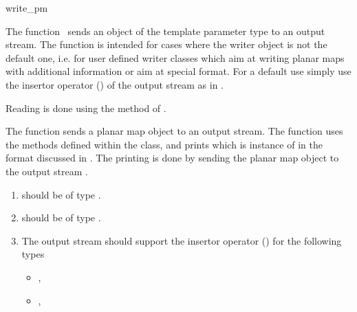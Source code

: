 
\ccRefPageBegin


\begin{ccRefFunction}{write_pm}


\ccDefinition

The function \ccRefName\ sends an object of the template parameter
type  to an output stream. The function is intended
for cases where the writer object is not the default one, i.e. for
user defined writer classes which aim at writing planar maps with
additional information or aim at special format. For a default use
simply use the insertor operator (\ccc{<<}) of the output stream as in
.

Reading is done using the  method of
.


           {The function sends a planar map object to an output
           stream. The function uses the methods defined within the
            class, and prints  which is instance of
            in the format discussed in
           . The printing is done by sending
           the planar map object to the output stream .}

\begin{enumerate}
   \item    {}  
            should be of type .
   \item    {}  
            should be of type .
    
   \item    The output stream should support the insertor operator (\ccc{<<}) 
            for the following types
            \begin{itemize}
                \item {},
                \item {}, 
            \end{itemize}
\end{enumerate}

\ccSeeAlso
     \\



\end{ccRefFunction} %

\ccRefPageEnd
